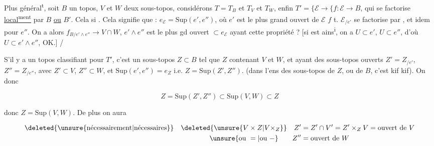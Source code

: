 Plus général\textsuperscript{t}, soit $B$ un topos, $V$ et $W$ deux sous-topos, considérons $T=T_B$  et $T_V$ et $T_W$, enfin $T'=\{\mathcal E\to\{f\colon\mathcal E\to B$, qui se factorise \uline{local\textsuperscript{ment}} par $B$ \uline{ou} $B'$. Cela si . Cela signifie que :  $e_{\mathcal E}=\mathrm{Sup}(e',e'')$, où $e'$ est le plus grand ouvert de $\mathcal E$   $f$ t. $\mathcal E_{/e'}$ se factorise par , et idem pour $e''$. On a alors $f_{B/e'\wedge e''}\longrightarrow V\cap W$,  $e'\wedge e''$ est le plus gd ouvert  $\subset e_{\mathcal E}$ ayant cette propriété ? [si   est ains\textsuperscript{i}, on a $U\subset e'$, $U\subset e''$, d'où $U\subset e'\wedge e''$, OK.] /


S'il y a un topos classifiant pour $T'$, c'est un sous-topos  $Z\subset B$ tel que $Z$  contenant $V$ et $W$, et ayant des sous-topos ouverts $Z'=Z_{/e'}$, $Z''=Z_{/e''}$, avec $Z'\subset V$, $Z''\subset W$, et  $\mathrm{Sup}(e',e'')=e_Z$ i.e. $Z=\mathrm{Sup}(Z',Z'')$. (dans l'ens des sous-topos de $Z$, ou de $B$, c'est kif kif). On  donc

\[
 Z=\mathrm{Sup}(Z',Z'')\subset\mathrm{Sup}(V,W)\subset Z
\]

donc $Z=\mathrm{Sup}(V,W)$. De plus on aura 

\[
 \begin{aligned}
 \deleted{\text{\unsure{nécessairement|nécessaires}}}\quad
 \deleted{\ensuremath{\unsure{V\times Z|V\times_Z}}}\quad
 Z'&=Z'\cap V'=Z'\times_Z V=\text{ouvert de }V\\
 \unsure{\text{ou }=|\text{ou }-}\qquad Z''&=\text{ouvert de }W
 \end{aligned}
\]
